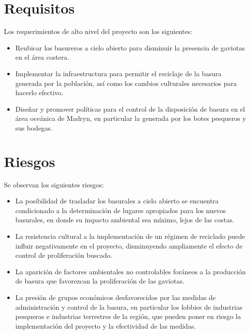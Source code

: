 \documentclass[a4paper,11pt]{article}
\begin{document}
\section{Requisitos}

Los requerimientos de alto nivel del proyecto son los siguientes:

\begin{itemize}

  \item Reubicar los basureros a cielo abierto para disminuir la presencia de
    gaviotas en el área costera.

  \item Implementar la infraestructura para permitir el reciclaje de la basura
    generada por la población, así como los cambios culturales necesarios para
    hacerlo efectivo.

  \item Diseñar y promover políticas para el control de la disposición de
    basura en el área oceánica de Madryn, en particular la generada por los
    botes pesqueros y sus bodegas.

\end{itemize}

\section{Riesgos}

Se observan los siguientes riesgos:

\begin{itemize}

  \item La posibilidad de trasladar los basurales a cielo abierto se encuentra
    condicionado a la determinación de lugares apropiados para los nuevos
    basurales, en donde su impacto ambiental sea mínimo, lejos de las costas.

  \item La resistencia cultural a la implementación de un régimen de reciclado
    puede influir negativamente en el proyecto, disminuyendo ampliamente el
    efecto de control de proliferación buscado.

  \item La aparición de factores ambientales no controlables foráneos a la
    producción de basura que favorezcan la proliferación de las gaviotas.

  \item La presión de grupos económicos desfavorecidos por las medidas de
    administración y control de la basura, en particular los lobbies de
    industrias pesqueras e industrias terrestres de la región, que pueden poner
    en riesgo la implementación del proyecto y la efectividad de las medidas.

\end{itemize}
\end{document}
